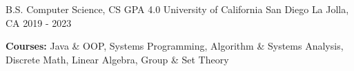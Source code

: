 
\begin{cventries}
  \cventry
    {B.S. Computer Science, CS GPA 4.0}
    {University of California San Diego}
    {La Jolla, CA}
    {2019 - 2023}
    {
      \begin{cvitems}
        \item {\textbf{Courses:} Java \& OOP, Systems Programming, Algorithm \& Systems Analysis, Discrete Math, Linear Algebra, Group \& Set Theory}
      \end{cvitems}
    }
\end{cventries}
